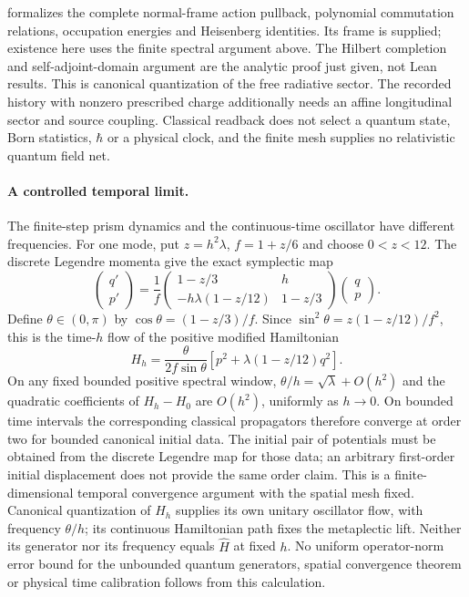  formalizes the complete
normal-frame action pullback, polynomial commutation relations, occupation
energies and Heisenberg identities. Its frame is supplied; existence here
uses the finite spectral argument above. The Hilbert completion and
self-adjoint-domain argument are the analytic proof just given, not Lean
results. This is canonical quantization of the free radiative sector.
The recorded history with nonzero prescribed charge additionally needs an
affine longitudinal sector and source coupling. Classical readback does
not select a quantum state, Born statistics, \(\hbar\) or a physical
clock, and the finite mesh supplies no relativistic quantum field net.

\paragraph{A controlled temporal limit.}
The finite-step prism dynamics and the continuous-time oscillator have
different frequencies. For one mode, put \(z=h^2\lambda\),
\(f=1+z/6\) and choose \(0<z<12\). The discrete Legendre momenta
give the exact symplectic map
\[
 \begin{pmatrix}q'\\p'\end{pmatrix}
 =\frac1f\begin{pmatrix}
 1-z/3&h\\-h\lambda(1-z/12)&1-z/3
 \end{pmatrix}\begin{pmatrix}q\\p\end{pmatrix}.
\]
Define \(\theta\in(0,\pi)\) by
\(\cos\theta=(1-z/3)/f\). Since
\(\sin^2\theta=z(1-z/12)/f^2\), this is the time-\(h\)
flow of the positive modified Hamiltonian
\[
 H_h=\frac{\theta}{2f\sin\theta}
        \left[p^2+\lambda(1-z/12)q^2\right].
\]
On any fixed bounded positive spectral window,
\(\theta/h=\sqrt\lambda+O(h^2)\) and the quadratic coefficients
of \(H_h-H_0\) are \(O(h^2)\), uniformly as \(h\to0\).
On bounded time intervals the corresponding classical propagators
therefore converge at order two for bounded canonical initial data.
The initial pair of potentials must be obtained from the discrete
Legendre map for those data; an arbitrary first-order initial displacement
does not provide the same order claim. This is a finite-dimensional
temporal convergence argument with the spatial mesh fixed.
Canonical quantization of \(H_h\) supplies its own unitary oscillator
flow, with frequency \(\theta/h\); its continuous Hamiltonian path
fixes the metaplectic lift. Neither its generator nor its frequency equals
\(\widehat H\) at fixed \(h\). No uniform operator-norm error bound
for the unbounded quantum generators, spatial convergence theorem or
physical time calibration follows from this calculation.
